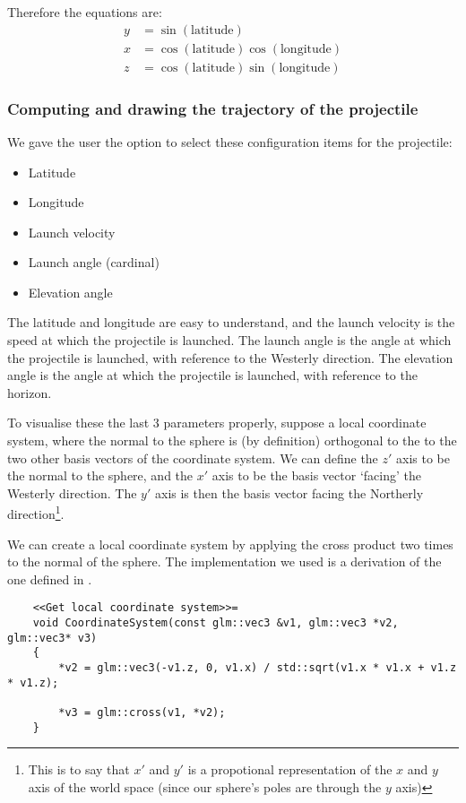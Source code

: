 \documentclass[main.tex]{subfiles}
\begin{document}
Therefore the equations are:
\begin{align*}
    y &= \sin(\text{latitude})\\
    x &= \cos(\text{latitude})\cos(\text{longitude})\\
    z &= \cos(\text{latitude})\sin(\text{longitude})
\end{align*}

\subsubsection{Computing and drawing the trajectory of the projectile}
We gave the user the option to select these configuration items for the projectile:
\begin{itemize}
    \item Latitude
    \item Longitude
    \item Launch velocity
    \item Launch angle (cardinal)
    \item Elevation angle
\end{itemize}

The latitude and longitude are easy to understand, and the launch velocity is the speed at which the projectile is launched.
The launch angle is the angle at which the projectile is launched, with reference to the Westerly direction.
The elevation angle is the angle at which the projectile is launched, with reference to the horizon.

To visualise these the last 3 parameters properly, suppose a local coordinate system, where the normal to the sphere is (by definition) orthogonal to the
to the two other basis vectors of the coordinate system. We can define the $z'$ axis to be the normal to the sphere, and the $x'$ axis to be the 
basis vector `facing' the Westerly direction. The $y'$ axis is then the basis vector facing the Northerly direction\footnote{This is to say that $x'$ and $y'$ is a propotional representation
of the $x$ and $y$ axis of the world space (since our sphere's poles are through the $y$ axis)}.

We can create a local coordinate system by applying the cross product two times to the normal of the sphere.
The implementation we used is a derivation of the one defined in \cite{Vectors}.
\begin{lstlisting}
    <<Get local coordinate system>>=
    void CoordinateSystem(const glm::vec3 &v1, glm::vec3 *v2, glm::vec3* v3)
    {
        *v2 = glm::vec3(-v1.z, 0, v1.x) / std::sqrt(v1.x * v1.x + v1.z * v1.z);

        *v3 = glm::cross(v1, *v2);
    }
\end{lstlisting}
\end{document}
